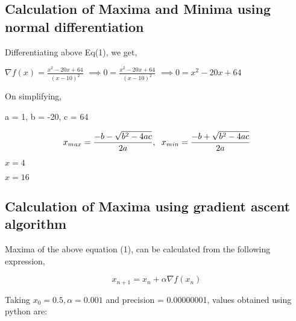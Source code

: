 \documentclass[10pt,twocolumn]{article}
\begin{document}
\subsection{Calculation of Maxima and Minima using normal differentiation}
\vspace{0.35cm}
\begin{flushleft}
Differentiating above Eq(1), we get,
\end{flushleft}
\center
$\nabla f(x) = \frac{x^2-20x+64}{(x-10)^2}$
\endcenter
\center
$\implies 0 =  \frac{x^2-20x+64}{(x-10)^2}$\endcenter
$\implies 0 =x^2-20x+64$
\begin{flushleft}
On simplifying,
\begin{flushleft}
a = 1, b = -20, c = 64
\end{flushleft}
\begin{equation}
  x_{max}=\frac{-b-\sqrt{b^2-4ac}}{2a}, \hspace{0.2cm} x_{min}=\frac{-b+\sqrt{b^2-4ac}}{2a}
\end{equation}
\begin{center}
  $x=4$
\end{center}
\begin{center}
\vspace{0.1cm}
 $x=16$
\end{center}


\begin{flushleft}
\subsection{Calculation of Maxima using gradient ascent algorithm}
\end{flushleft}
\begin{flushleft}
Maxima of the above equation (1), can be calculated from the following expression,\\
\end{flushleft}
    \begin{equation}
        x_{n+1}= x_n + \alpha \nabla f(x_n)
    \end{equation}
\begin{flushleft}
Taking $x_0=0.5,\alpha=0.001$ and precision = 0.00000001, values obtained using python are:
\end{flushleft} 
\center
        \\
        \vspace{0.45cm}
\endcenter
\begin{flushleft}

\end{flushleft}
\end{flushleft}
\end{document}
